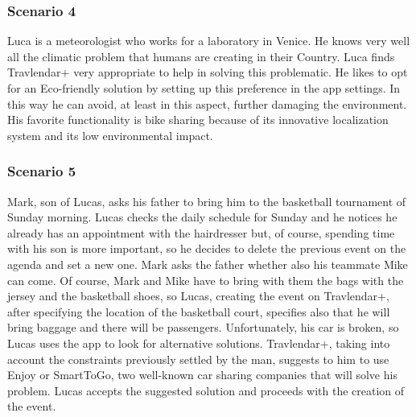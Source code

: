 	\subsubsection{Scenario 4}
	Luca is a meteorologist who works for a laboratory in Venice. He knows very well all the climatic problem that humans are creating in their Country. Luca finds Travlendar+ very appropriate to help in solving this problematic. He likes to opt for an Eco-friendly solution by setting up this preference in the app settings. In this way he can avoid, at least in this aspect, further damaging the environment. His favorite functionality is bike sharing because of its innovative localization system and its low environmental impact.
	\subsubsection{Scenario 5}
		Mark, son of Lucas, asks his father to bring him to the basketball tournament of Sunday morning.\newline
		Lucas checks the daily schedule for Sunday and he notices he already has an appointment with the hairdresser but, of course, spending time with his son is more important, so he decides to delete the previous event on the agenda and set a new one.\newline
		Mark asks the father whether also his teammate Mike can come.
		Of course, Mark and Mike have to bring with them the bags with the jersey and the basketball shoes, so Lucas, creating the event on Travlendar+, after specifying the location of the basketball court, specifies also that he will bring baggage and there will be passengers.\newline
		Unfortunately, his car is broken, so Lucas uses the app to look for alternative solutions.\newline
		Travlendar+, taking into account the constraints previously settled by the man, suggests to him to use Enjoy or SmartToGo, two well-known car sharing companies that will solve his problem.\newline
		Lucas accepts the suggested solution and proceeds with the creation of the event.
